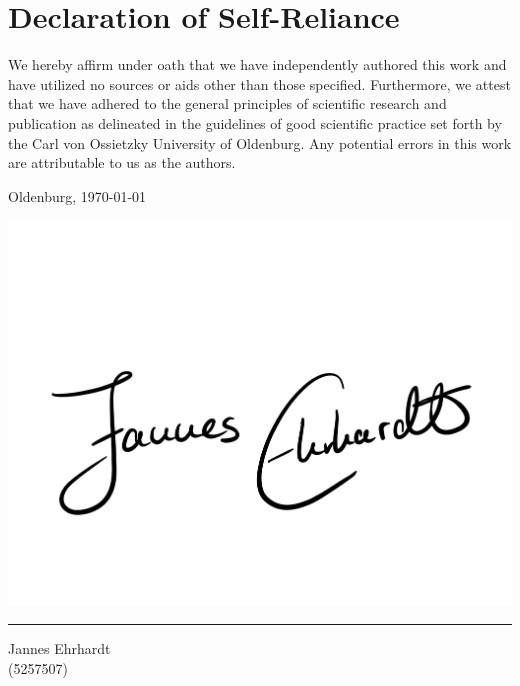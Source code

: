 \section{Declaration of Self-Reliance}




We hereby affirm under oath that we have independently authored this work and have utilized no sources or aids other than those specified. Furthermore, we attest that we have adhered to the general principles of scientific research and publication as delineated in the guidelines of good scientific practice set forth by the Carl von Ossietzky University of Oldenburg. Any potential errors in this work are attributable to us as the authors.

\vspace{1cm}

  \noindent  Oldenburg, \today
    
    \vspace{1cm}



    


    \vspace*{-3cm}\hspace*{3.85cm}\includegraphics[width=0.6\columnwidth]{Graphs/Unterschrift_Jannes_1.pdf} \\
  
    \vspace{-3.3cm}  
    
    \rule{\linewidth}{1pt}
    \vspace{-1.1cm}
    \begin{center}
        Jannes Ehrhardt \\
        \vspace{-0.2cm} 
        (5257507)
    \end{center}
